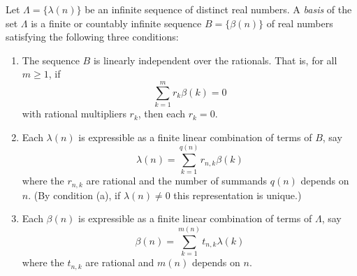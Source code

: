 Let $\Lambda = \{\lambda(n)\}$ be an infinite sequence of distinct real numbers. A \textit{basis} of the set $\Lambda$ is a finite or countably infinite sequence $B = \{\beta(n)\}$ of real numbers satisfying the following three conditions:

\begin{enumerate}
\item[(a)] The sequence $B$ is linearly independent over the rationals. That is, for all $m \geq 1$, if
$$\sum_{k=1}^{m} r_k \beta(k) = 0$$
with rational multipliers $r_k$, then each $r_k = 0$.

\item[(b)] Each $\lambda(n)$ is expressible as a finite linear combination of terms of $B$, say
$$\lambda(n) = \sum_{k=1}^{q(n)} r_{n,k} \beta(k)$$
where the $r_{n,k}$ are rational and the number of summands $q(n)$ depends on $n$. (By condition (a), if $\lambda(n) \neq 0$ this representation is unique.)

\item[(c)] Each $\beta(n)$ is expressible as a finite linear combination of terms of $\Lambda$, say
$$\beta(n) = \sum_{k=1}^{m(n)} t_{n,k} \lambda(k)$$
where the $t_{n,k}$ are rational and $m(n)$ depends on $n$.
\end{enumerate}
